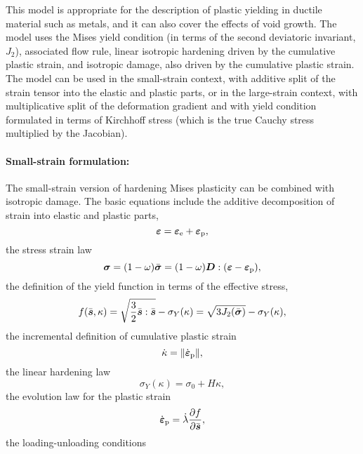 \documentclass[a4paper]{article}
\newcommand{\mbf}[1]{\mbox{\boldmath$#1$}}
\newcommand{\eps} {\mbf{\varepsilon}}
\newcommand{\epspd} {\dot{\eps}_{\mathrm{p}}}
\newcommand{\veps}{\mbf{\varepsilon}}  %
\newcommand{\vsig}{\mbf{\sigma}}%
\newcommand{\vs}{\mbf{s}}%
\begin{document}
This model is appropriate for the description of plastic yielding in ductile material such as metals, and it can also cover the effects of void growth.
The model uses the Mises yield condition (in terms of the second deviatoric invariant, $J_2$),
associated flow rule, linear isotropic hardening driven by the cumulative plastic strain,
and isotropic damage, also driven by the cumulative plastic strain. The model can be used in the small-strain context, with additive split 
of the strain tensor into the elastic and plastic parts, or in the large-strain context,
with multiplicative split of the deformation gradient and with yield condition formulated in terms of Kirchhoff stress (which is the true Cauchy stress multiplied by the Jacobian).

\paragraph{Small-strain formulation:}
The small-strain version of hardening Mises plasticity can be combined with isotropic damage.
The basic equations include the additive decomposition of strain into elastic and plastic parts,
\begin{equation}\label{VMadditiveDecomposition}
\veps = \veps_{\rm{e}} + \veps_{\rm{p}},
\end{equation}
the stress strain law 
\begin{equation}\label{VMconstitutiveEquation}
\vsig = (1-\omega)\bar{\vsig}=(1-\omega)\mbf{D} :(\veps-\veps_{\rm{p}}),
\end{equation}
the definition of the yield function in terms of the effective stress,
\begin{equation}\label{VMvonMisesCondition}
f(\bar{\vs},\kappa) = \sqrt{\frac{3}{2}\bar{\vs}:\bar{\vs}}-\sigma_Y(\kappa) = \sqrt{3 J_2(\bar{\vsig})}-\sigma_Y(\kappa),
\end{equation}
the incremental definition of cumulative plastic strain
\begin{equation}\label{VMcumPlasStrain}
\dot{\kappa} = \| \epspd \|,
\end{equation}
the linear hardening law
\begin{equation}\label{VMlinearHardeningLaw}
\sigma_Y(\kappa) = \sigma_0 + H\kappa,
\end{equation}
the evolution law for the plastic strain
\begin{equation}
 \epspd = \dot{\lambda}\frac{\partial f}{\partial \bar{\vs}},
\end{equation}
the loading-unloading conditions
\end{document}
